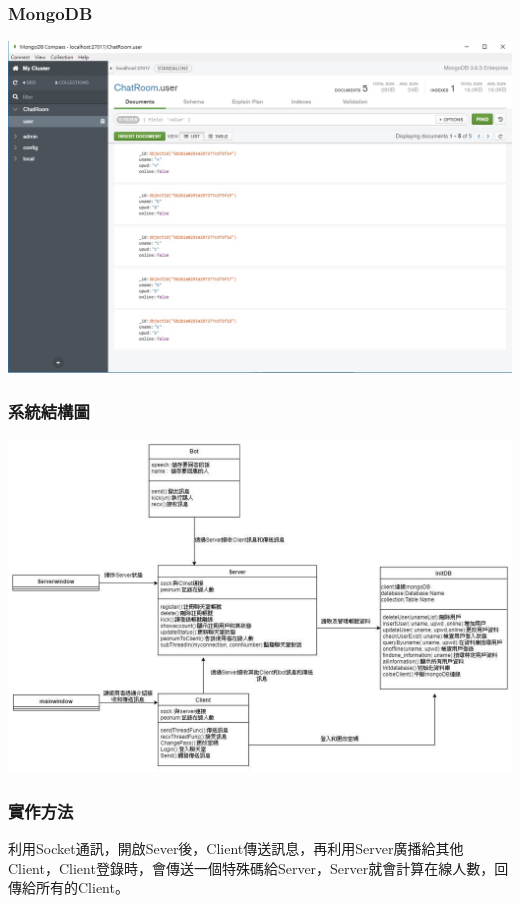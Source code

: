 \documentclass[utf8x]{beamer}
\begin{document}
\begin{frame}[t]
\frametitle{\LARGE MongoDB} %
\hspace{0.5cm} \includegraphics[scale=0.3]{mongodb}
\end{frame}
\begin{frame}[t]
\frametitle{\huge 系統結構圖} %
\hspace{3em}  \includegraphics[scale=0.25]{Class}
\end{frame}

\begin{frame}[t]
\frametitle{\LARGE 實作方法} %
\vspace{2em}
\hspace{2em} \Large 利用Socket通訊，開啟Sever後，Client傳送訊息，再利用Server廣播給其他Client，Client登錄時，會傳送一個特殊碼給Server，Server就會計算在線人數，回傳給所有的Client。
\end{frame}
\end{document}
